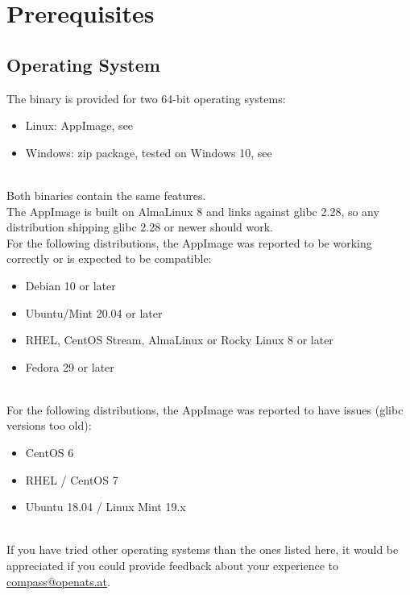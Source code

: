 \section{Prerequisites}

\subsection{Operating System}
\label{sec:install_os}

The binary is provided for two 64-bit operating systems:

\begin{itemize}
\item Linux: AppImage, see 
\item Windows: zip package, tested on Windows 10, see 
\end{itemize}
\ \\

Both binaries contain the same features. \\

The AppImage is built on AlmaLinux 8 and links against glibc 2.28, so any distribution shipping glibc 2.28 or newer should work. \\
For the following distributions, the AppImage was reported to be working correctly or is expected to be compatible:

\begin{itemize}
\item Debian 10 or later
\item Ubuntu/Mint 20.04 or later
\item RHEL, CentOS Stream, AlmaLinux or Rocky Linux 8 or later
\item Fedora 29 or later
\end{itemize}
\ \\

For the following distributions, the AppImage was reported to have issues (glibc versions too old):

\begin{itemize}
\item CentOS 6
\item RHEL / CentOS 7
\item Ubuntu 18.04 / Linux Mint 19.x
\end{itemize}
\ \\

If you have tried other operating systems than the ones listed here, it would be appreciated if you could provide feedback about your experience to \href{mailto:compass@openats.at}{compass@openats.at}.\\

